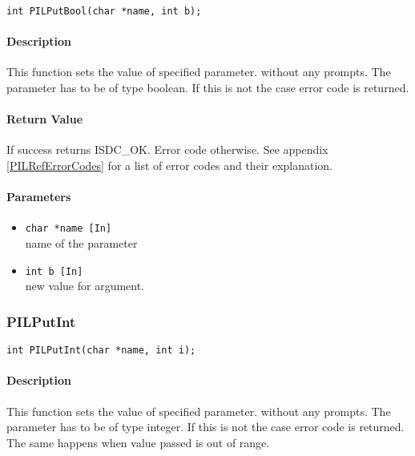 \begin{verbatim}
int PILPutBool(char *name, int b); 
\end{verbatim}

\paragraph{Description\\}
This function sets the value of specified parameter. without any prompts.
The parameter has to be of type
boolean. If this is not the case error code is returned. 

\paragraph{Return Value\\}
If success returns ISDC\_OK. Error code otherwise. See appendix \ref{PILRefErrorCodes}
for a list of error codes and their explanation.

\paragraph{Parameters}
\begin{itemize}
\item
{\tt char *name [In] } \\
name of the parameter 
\item
{\tt int b [In] } \\
new value for argument.
\end{itemize}



\subsubsection{PILPutInt}

\begin{verbatim}
int PILPutInt(char *name, int i); 
\end{verbatim}

\paragraph{Description\\}
This function sets the value of specified parameter. without any prompts.
The parameter has to be of type integer.
If this is not the case error code is returned. 
The same happens when value passed is out of range.

